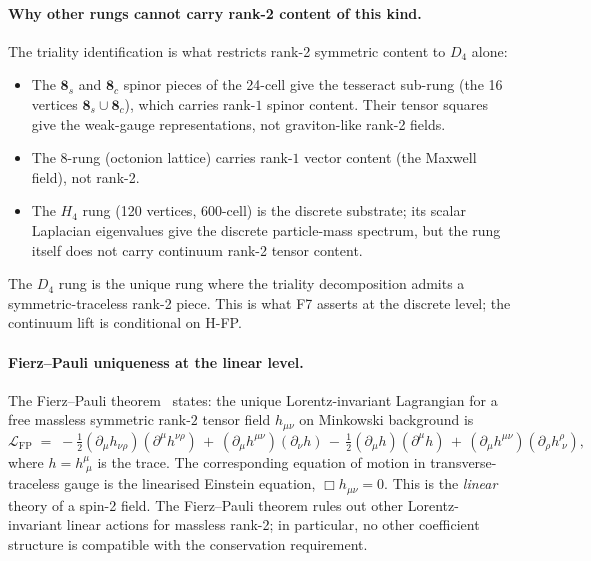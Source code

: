 \documentclass[11pt]{article}
\theoremstyle{plain}
\theoremstyle{definition}
\theoremstyle{remark}
\begin{document}
\paragraph{Why other rungs cannot carry rank-2 content of this kind.}
The triality identification is what restricts rank-2 symmetric content to $D_4$ alone:
\begin{itemize}[leftmargin=2em]
\item The $\mathbf{8}_s$ and $\mathbf{8}_c$ spinor pieces of the 24-cell give the tesseract sub-rung (the 16 vertices $\mathbf{8}_s \cup \mathbf{8}_c$), which carries rank-$1$ spinor content. Their tensor squares give the weak-gauge representations, not graviton-like rank-2 fields.
\item The 8-rung (octonion lattice) carries rank-$1$ vector content (the Maxwell field), not rank-2.
\item The $H_4$ rung (120 vertices, 600-cell) is the discrete substrate; its scalar Laplacian eigenvalues give the discrete particle-mass spectrum, but the rung itself does not carry continuum rank-2 tensor content.
\end{itemize}
The $D_4$ rung is the unique rung where the triality decomposition admits a symmetric-traceless rank-2 piece. This is what F7 asserts at the discrete level; the continuum lift is conditional on H-FP.

\paragraph{Fierz--Pauli uniqueness at the linear level.}
The Fierz--Pauli theorem~\citep{FierzPauli1939} states: the unique Lorentz-invariant Lagrangian for a free massless symmetric rank-$2$ tensor field $h_{\mu\nu}$ on Minkowski background is
\[
  \mathcal{L}_\mathrm{FP} \;=\; -\tfrac{1}{2} (\partial_\mu h_{\nu\rho})(\partial^\mu h^{\nu\rho}) \,+\, (\partial_\mu h^{\mu\nu})(\partial_\nu h) \,-\, \tfrac{1}{2}(\partial_\mu h)(\partial^\mu h) \,+\, (\partial_\mu h^{\mu\nu})(\partial_\rho h^\rho_{\;\nu}),
\]
where $h = h^\mu_{\;\mu}$ is the trace. The corresponding equation of motion in transverse-traceless gauge is the linearised Einstein equation, $\Box h_{\mu\nu} = 0$. This is the \emph{linear} theory of a spin-2 field. The Fierz--Pauli theorem rules out other Lorentz-invariant linear actions for massless rank-2; in particular, no other coefficient structure is compatible with the conservation requirement.
\end{document}
